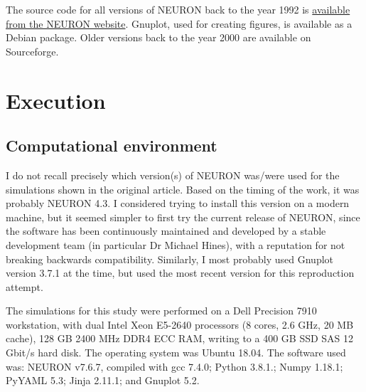 

The source code for all versions of NEURON back to the year 1992 is \href{https://neuron.yale.edu/ftp/neuron/versions/}{available from the NEURON website}. Gnuplot, used for creating figures, is available as a Debian package. Older versions back to the year 2000 are available on Sourceforge.


\section{Execution}



\subsection{Computational environment}

I do not recall precisely which version(s) of NEURON was/were used for the simulations shown in the original article.
Based on the timing of the work, it was probably NEURON 4.3. I considered trying to install this version on a modern machine,
but it seemed simpler to first try the current release of NEURON, since the software has been continuously maintained and developed
by a stable development team (in particular Dr Michael Hines), with a reputation for not breaking backwards compatibility.
Similarly, I most probably used Gnuplot version 3.7.1 at the time, but used the most recent version for this reproduction attempt.


The simulations for this study were performed on a Dell Precision 7910 workstation, with dual Intel Xeon E5-2640 processors (8 cores, 2.6 GHz, 20 MB cache), 128 GB 2400 MHz DDR4 ECC RAM, writing to a 400 GB SSD SAS 12 Gbit/s hard disk. The operating system was Ubuntu 18.04.
The software used was: NEURON v7.6.7, compiled with gcc 7.4.0; Python 3.8.1.; Numpy 1.18.1; PyYAML 5.3; Jinja 2.11.1; and Gnuplot 5.2.


